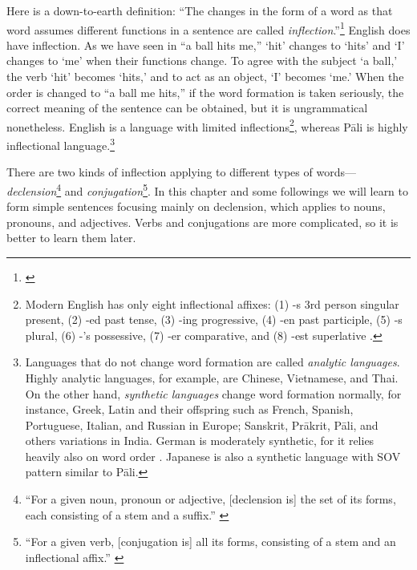Here is a down-to-earth definition: ``The changes in the form of a word as that word assumes different functions in a sentence are called \emph{inflection}.''\footnote{\citealp[p.~44]{fairbairn:understanding}} English does have inflection. As we have seen in ``a ball hits me,'' `hit' changes to `hits' and `I' changes to `me' when their functions change. To agree with the subject `a ball,' the verb `hit' becomes `hits,' and to act as an object, `I' becomes `me.' When the order is changed to ``a ball me hits,'' if the word formation is taken seriously, the correct meaning of the sentence can be obtained, but it is ungrammatical nonetheless. English is a language with limited inflections\footnote{Modern English has only eight inflectional affixes: (1) -s 3rd person singular present, (2) -ed past tense, (3) -ing progressive, (4) -en past participle, (5) -s plural, (6) -'s possessive, (7) -er comparative, and (8) -est superlative  \citep[p.~47]{fromkin:language}.}, whereas P\=ali is highly inflectional language.\footnote{Languages that do not change word formation are called \emph{analytic languages}. Highly analytic languages, for example, are Chinese, Vietnamese, and Thai. On the other hand, \emph{synthetic languages} change word formation normally, for instance, Greek, Latin and their offspring such as French, Spanish, Portuguese, Italian, and Russian in Europe; Sanskrit, Pr\=akrit, P\=ali, and others variations in India. German is moderately synthetic, for it relies heavily also on word order \citep[See][pp.~44--5]{fairbairn:understanding}. Japanese is also a synthetic language with SOV pattern similar to P\=ali.}

There are two kinds of inflection applying to different types of words---\emph{declension}\footnote{``For a given noun, pronoun or adjective, [declension is] the set of its forms, each consisting of a stem and a suffix.'' \citep[p.~122]{brownmiller:dict}} and \emph{conjugation}\footnote{``For a given verb, [conjugation is] all its forms, consisting of a stem and an inflectional affix.'' \citep[p.~99]{brownmiller:dict}}. In this chapter and some followings we will learn to form simple sentences focusing mainly on declension, which applies to nouns, pronouns, and adjectives. Verbs and conjugations are more complicated, so it is better to learn them later.

